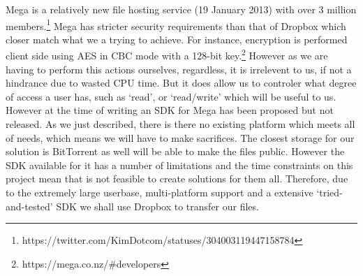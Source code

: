 \documentclass[12pt, titlepage]{article}
\begin{document}
\newline \indent Mega is a relatively new file hosting service (19 January 2013) with over 3 million members.\footnote{https://twitter.com/KimDotcom/statuses/304003119447158784} Mega  has stricter security requirements than that of Dropbox which closer match what we a trying to achieve. For instance, encryption is performed client side using AES in CBC mode with a 128-bit key.\footnote{https://mega.co.nz/\#developers} However as we are having to perform this actions ourselves, regardless, it is irrelevent to us, if not a hindrance due to wasted CPU time. But it does allow us to controler what degree of access a user has, such as `read', or `read/write' which will be useful to us. However at the time of writing an SDK for Mega has been proposed but not released.
\newline \indent As we just described, there is there no existing platform which meets all of needs, which means we will have to make sacrifices. The closest storage for our solution is BitTorrent as well will be able to make the files public. However the SDK available for it has a number of limitations and the time constraints on this project mean that is not feasible to create solutions for them all. Therefore, due to the extremely large userbase, multi-platform support and a extensive `tried-and-tested' SDK we shall use Dropbox to transfer our files.
\end{document}
